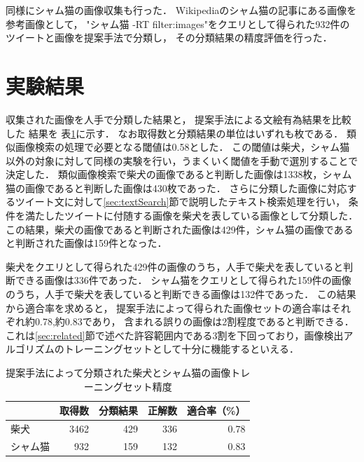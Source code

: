同様にシャム猫の画像収集も行った．
Wikipediaのシャム猫の記事にある画像を参考画像として，
"シャム猫 -RT filter:images"をクエリとして得られた932件のツイートと画像を提案手法で分類し，
その分類結果の精度評価を行った．

\section{実験結果}
\label{sec:expresult}

収集された画像を人手で分類した結果と，
提案手法による文絵有為結果を比較した
結果を
表\ref{tab:result-shiba}に示す．
なお取得数と分類結果の単位はいずれも枚である．
%
類似画像検索の処理で必要となる閾値は0.58とした．
この閾値は柴犬，シャム猫以外の対象に対して同様の実験を行い，うまくいく閾値を手動で選別することで決定した．
類似画像検索で柴犬の画像であると判断した画像は1338枚，シャム猫の画像であると判断した画像は430枚であった．
%
さらに分類した画像に対応するツイート文に対して\ref{sec:textSearch}節で説明したテキスト検索処理を行い，
条件を満たしたツイートに付随する画像を柴犬を表している画像として分類した．
この結果，柴犬の画像であると判断された画像は429件，シャム猫の画像であると判断された画像は159件となった．


柴犬をクエリとして得られた429件の画像のうち，人手で柴犬を表していると判断できる画像は336件であった．
シャム猫をクエリとして得られた159件の画像のうち，人手で柴犬を表していると判断できる画像は132件であった．
この結果から適合率を求めると，
提案手法によって得られた画像セットの適合率はそれぞれ約0.78,約0.83であり，
含まれる誤りの画像は2割程度であると判断できる．
これは\ref{sec:related}節で述べた許容範囲内である3割を下回っており，画像検出アルゴリズムのトレーニングセットとして十分に機能するといえる．


\begin{table}[tb]
\begin{center}
\caption{提案手法によって分類された柴犬とシャム猫の画像トレーニングセット精度}
\label{tab:result-shiba}
\begin{tabular}{|l|r|r|r|r|}\hline
& 取得数& 分類結果& 正解数& 適合率（\%） \\ \hline \hline

柴犬& 3462& 429& 336& 0.78 \\ \hline
シャム猫& 932& 159& 132& 0.83 \\ \hline
\end{tabular}
\end{center}
\end{table}

